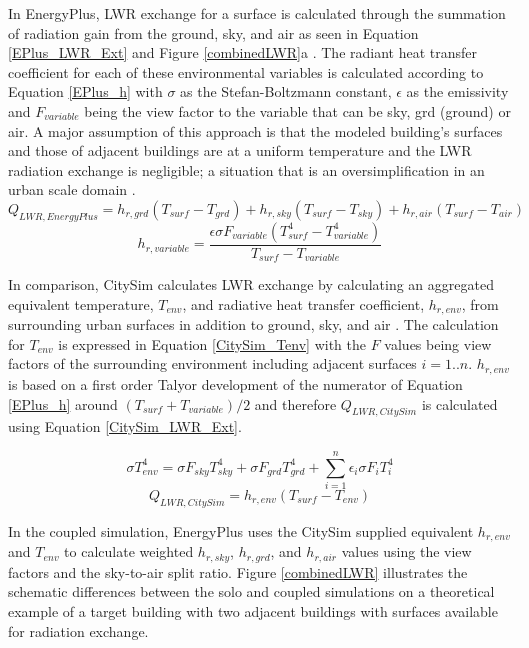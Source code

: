 \documentclass{tBPS2e}
\theoremstyle{plain}
\theoremstyle{definition}
\theoremstyle{remark}
\begin{document}
In EnergyPlus, LWR exchange for a surface is calculated through the summation
of radiation gain from the ground, sky, and air as seen in Equation
\ref{EPlus_LWR_Ext} and Figure \ref{combinedLWR}a \citep{united_states_department_of_energy_doe_energyplus_2015}.
The radiant heat transfer coefficient for each of these environmental
variables is calculated according to Equation \ref{EPlus_h} with $\sigma$ as
the Stefan-Boltzmann constant, $\epsilon$ as the emissivity and $F_{variable}$ being the
view factor to the variable that can be sky, grd (ground) or air. A major
assumption of this approach is that the modeled building's surfaces and those
of adjacent buildings are at a uniform temperature and the LWR radiation
exchange is negligible; a situation that is an oversimplification in an urban
scale domain \citep{evins_simulating_2014}.
\begin{equation} \label{EPlus_LWR_Ext} 
Q_{LWR,EnergyPlus} = h_{r,grd}(T_{surf}-T_{grd}) + h_{r,sky}(T_{surf}-T_{sky}) + h_{r,air}(T_{surf}-T_{air})
\end{equation}
\begin{equation} \label{EPlus_h} 
h_{r,variable} = \frac{\epsilon\sigma F_{variable}(T^{4}_{surf}-T^{4}_{variable})}{T_{surf}-T_{variable}}
\end{equation}

In comparison, CitySim calculates LWR exchange by calculating an aggregated
equivalent temperature, $T_{env}$, and radiative heat transfer coefficient,
$h_{r,env}$, from surrounding urban surfaces in addition to ground, sky, and
air \citep{robinson_citysim:_2009}. The calculation for $T_{env}$ is expressed in
Equation \ref{CitySim_Tenv} with the $F$ values being view factors of the
surrounding environment including adjacent surfaces $i=1..n$. $h_{r,env}$ is
based on a first order Talyor development of the numerator of Equation
\ref{EPlus_h} around $(T_{surf}+T_{variable})/2$ and therefore
$Q_{LWR,CitySim}$ is calculated using Equation \ref{CitySim_LWR_Ext}.

\begin{equation} \label{CitySim_Tenv} 
\sigma T_{env}^4 = \sigma F_{sky}T_{sky}^4 +\sigma F_{grd}T_{grd}^4 + \sum_{i=1}^{n} \epsilon_i \sigma F_{i}T_{i}^4
\end{equation}
\begin{equation} \label{CitySim_LWR_Ext} 
Q_{LWR,CitySim} = h_{r,env}(T_{surf}-T_{env})
\end{equation}

In the coupled simulation, EnergyPlus uses the CitySim supplied equivalent
$h_{r,env}$ and $T_{env}$ to calculate weighted $h_{r,sky}$, $h_{r,grd}$, and
$h_{r,air}$ values using the view factors and the sky-to-air split ratio.
Figure \ref{combinedLWR} illustrates the schematic differences between the
solo and coupled simulations on a theoretical example of a target building
with two adjacent buildings with surfaces available for radiation exchange.
\end{document}
